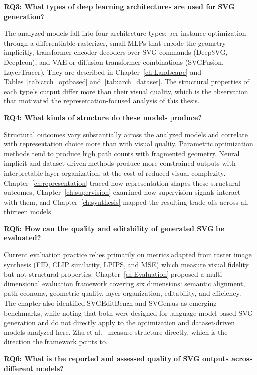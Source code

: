 \textbf{RQ3: What types of deep learning architectures 
are used for SVG generation?}

The analyzed models fall into four architecture types: 
per-instance optimization through a differentiable 
rasterizer, small MLPs that encode the geometry 
implicitly, transformer encoder-decoders over SVG 
commands (DeepSVG, DeepIcon), and VAE or diffusion 
transformer combinations (SVGFusion, LayerTracer). 
They are described in Chapter~\ref{ch:Landscape} and 
Tables~\ref{tab:arch_optbased} and~\ref{tab:arch_dataset}. The 
structural properties of each type's output differ 
more than their visual quality, which is the 
observation that motivated the representation-focused 
analysis of this thesis.

\textbf{RQ4: What kinds of structure do these models 
produce?}

Structural outcomes vary substantially across the 
analyzed models and correlate with representation 
choice more than with visual quality. Parametric 
optimization methods tend to produce high path counts 
with fragmented geometry. Neural implicit and 
dataset-driven methods produce more constrained outputs 
with interpretable layer organization, at the cost of 
reduced visual complexity. Chapter~\ref{ch:representation} 
traced how representation shapes these structural outcomes,
Chapter~\ref{ch:supervision} examined how supervision signals interact with them, 
and Chapter~\ref{ch:synthesis} mapped the resulting trade-offs 
across all thirteen models.

\textbf{RQ5: How can the quality and editability of 
generated SVG be evaluated?}

Current evaluation practice relies primarily on metrics 
adapted from raster image synthesis (FID, CLIP 
similarity, LPIPS, and MSE) which measure visual 
fidelity but not structural properties. 
Chapter~\ref{ch:Evaluation} proposed a multi-dimensional 
evaluation framework covering six dimensions: semantic 
alignment, path economy, geometric quality, layer 
organization, editability, and efficiency. The chapter 
also identified SVGEditBench and SVGenius as emerging 
benchmarks, while noting that both were designed for 
language-model-based SVG generation and do not 
directly apply to the optimization and dataset-driven 
models analyzed here. Zhu et al.~\cite{zhuStructuralEvaluationMetrics2026} 
measure structure directly, which is the direction the 
framework points to.

\textbf{RQ6: What is the reported and assessed quality of SVG 
outputs across different models?}

